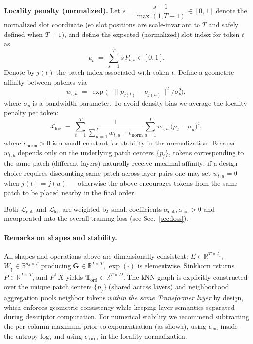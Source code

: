 \textbf{Locality penalty (normalized).} Let \(\tilde s = \dfrac{s-1}{\max(1,T-1)}\in[0,1]\) denote the normalized slot coordinate (so slot positions are scale-invariant to \(T\) and safely defined when \(T=1\)), and define the expected (normalized) slot index for token \(t\) as
\begin{equation}
\mu_t \;=\; \sum_{s=1}^T \tilde s\, P_{t,s} \in [0,1].
\end{equation}
Denote by \(j(t)\) the patch index associated with token \(t\). Define a geometric affinity between patches via
\begin{equation}
w_{t,u} \;=\; \exp\!\big(-\|p_{j(t)}-p_{j(u)}\|^2/\sigma_p^2\big),
\end{equation}
where \(\sigma_p\) is a bandwidth parameter. To avoid density bias we average the locality penalty per token:
\begin{equation}
\mathcal{L}_{\mathrm{loc}} \;=\; \sum_{t=1}^T \frac{1}{\sum_{u=1}^T w_{t,u} + \epsilon_{\mathrm{norm}}}\sum_{u=1}^T w_{t,u}\,\big(\mu_t - \mu_u\big)^2,
\end{equation}
where \(\epsilon_{\mathrm{norm}}>0\) is a small constant for stability in the normalization. Because \(w_{t,u}\) depends only on the underlying patch centers \(\{p_j\}\), tokens corresponding to the same patch (different layers) naturally receive maximal affinity; if a design choice requires discounting same-patch across-layer pairs one may set \(w_{t,u}=0\) when \(j(t)=j(u)\) — otherwise the above encourages tokens from the same patch to be placed nearby in the final order.

Both \(\mathcal{L}_{\mathrm{ent}}\) and \(\mathcal{L}_{\mathrm{loc}}\) are weighted by small coefficients \(\alpha_{\mathrm{ent}},\alpha_{\mathrm{loc}}>0\) and incorporated into the overall training loss (see Sec.~\ref{sec:loss}).

\paragraph{Remarks on shapes and stability.} All shapes and operations above are dimensionally consistent: \(E\in\mathbb{R}^{T\times d_a}\), \(W_{\uparrow}\in\mathbb{R}^{d_a\times T}\) producing \(\mathbf{G}\in\mathbb{R}^{T\times T}\), \(\exp(\cdot)\) is elementwise, Sinkhorn returns \(P\in\mathbb{R}^{T\times T}\), and \(P^\top X\) yields \(\mathbf{T}_{\mathrm{ord}}\in\mathbb{R}^{T\times D}\). The kNN graph is explicitly constructed over the unique patch centers \(\{p_j\}\) (shared across layers) and neighborhood aggregation pools neighbor tokens \emph{within the same Transformer layer} by design, which enforces geometric consistency while keeping layer semantics separated during descriptor computation. For numerical stability we recommend subtracting the per-column maximum prior to exponentiation (as shown), using \(\epsilon_{\mathrm{ent}}\) inside the entropy log, and using \(\epsilon_{\mathrm{norm}}\) in the locality normalization.


